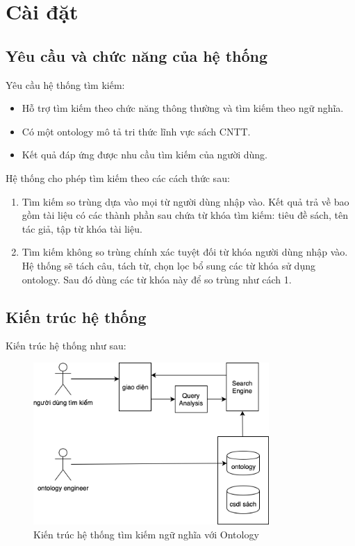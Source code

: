 \chapter{Cài đặt}

\section{Yêu cầu và chức năng của hệ thống}

Yêu cầu hệ thống tìm kiếm:
\begin{itemize}
    \item Hỗ trợ tìm kiếm theo chức năng thông thường và tìm kiếm theo ngữ nghĩa.
    \item Có một ontology mô tả tri thức lĩnh vực sách CNTT.
    \item Kết quả đáp ứng được nhu cầu tìm kiếm của người dùng.
\end{itemize}

Hệ thống cho phép tìm kiếm theo các cách thức sau:
\begin{enumerate}
    \item Tìm kiếm so trùng dựa vào mọi từ người dùng nhập vào. Kết quả trả về bao gồm tài liệu có các thành phần sau chứa từ khóa tìm kiếm: tiêu đề sách, tên tác giả, tập từ khóa tài liệu.
    \item Tìm kiếm không so trùng chính xác tuyệt đối từ khóa người dùng nhập vào. Hệ thống sẽ tách câu, tách từ, chọn lọc bổ sung các từ khóa sử dụng ontology. Sau đó dùng các từ khóa này để so trùng như cách 1.
\end{enumerate}


\section{Kiến trúc hệ thống}
Kiến trúc hệ thống như sau:

\begin{figure}[H]
    \centering
    \includegraphics[width=0.8\textwidth]{img/sys_design.png}
    \caption{Kiến trúc hệ thống tìm kiếm ngữ nghĩa với Ontology}
\end{figure}


